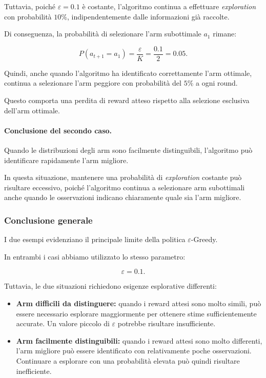 Tuttavia, poiché $\varepsilon=0.1$ è costante, l'algoritmo
continua a effettuare \textit{exploration} con probabilità $10\%$,
indipendentemente dalle informazioni già raccolte.

Di conseguenza, la probabilità di selezionare l'arm subottimale
$a_1$ rimane:

\[
P(a_{t+1}=a_1)
=
\frac{\varepsilon}{K}
=
\frac{0.1}{2}
=
0.05.
\]

Quindi, anche quando l'algoritmo ha identificato correttamente
l'arm ottimale, continua a selezionare l'arm peggiore
con probabilità del $5\%$ a ogni round.

Questo comporta una perdita di reward atteso rispetto
alla selezione esclusiva dell'arm ottimale.

\paragraph{Conclusione del secondo caso.}

Quando le distribuzioni degli arm sono facilmente distinguibili,
l'algoritmo può identificare rapidamente l'arm migliore.

In questa situazione, mantenere una probabilità di
\textit{exploration} costante può risultare eccessivo,
poiché l'algoritmo continua a selezionare arm subottimali
anche quando le osservazioni indicano chiaramente quale sia
l'arm migliore.

\subsubsection{Conclusione generale}

I due esempi evidenziano il principale limite della politica
$\varepsilon$-Greedy.

In entrambi i casi abbiamo utilizzato lo stesso parametro:

\[
\varepsilon=0.1.
\]

Tuttavia, le due situazioni richiedono esigenze esplorative differenti:

\begin{itemize}
    \item \textbf{Arm difficili da distinguere:}
    quando i reward attesi sono molto simili, può essere necessario
    esplorare maggiormente per ottenere stime sufficientemente accurate.
    Un valore piccolo di $\varepsilon$ potrebbe risultare insufficiente.

    \item \textbf{Arm facilmente distinguibili:}
    quando i reward attesi sono molto differenti, l'arm migliore può
    essere identificato con relativamente poche osservazioni.
    Continuare a esplorare con una probabilità elevata può quindi
    risultare inefficiente.
\end{itemize}

